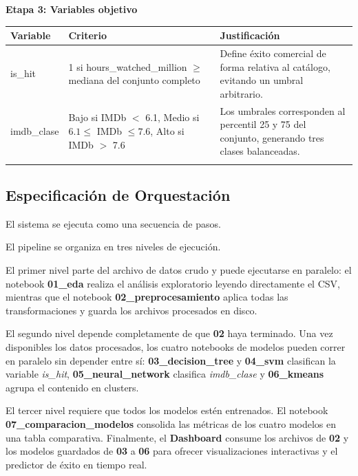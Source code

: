 \documentclass[12pt,a4paper]{article}
\begin{document}
\vspace{0.5cm}

\textbf{Etapa 3: Variables objetivo}

\vspace{0.2cm}
\begin{center}
\begin{tabular}{p{3cm} p{5.5cm} p{5.5cm}}
\toprule
Variable & Criterio & Justificaci\'on \\
\midrule
\addlinespace[0.15cm]
is\_hit &
1 si hours\_watched\_million $\geq$ mediana del conjunto completo &
Define \'exito comercial de forma relativa al cat\'alogo, evitando un umbral arbitrario. \\
\addlinespace[0.3cm]
imdb\_clase &
Bajo si IMDb $<$ 6.1, Medio si $6.1 \leq$ IMDb $\leq 7.6$, Alto si IMDb $>$ 7.6 &
Los umbrales corresponden al percentil 25 y 75 del conjunto, generando tres clases balanceadas. \\
\addlinespace[0.15cm]
\bottomrule
\end{tabular}
\end{center}

\newpage
\subsection*{Especificaci\'on de Orquestaci\'on}

El sistema se ejecuta como una secuencia de pasos.

El pipeline se organiza en tres niveles de ejecuci\'on.

El primer nivel parte del archivo de datos crudo y puede ejecutarse en paralelo: el notebook \textbf{01\_eda} realiza el an\'alisis exploratorio leyendo directamente el CSV, mientras que el notebook \textbf{02\_preprocesamiento} aplica todas las transformaciones y guarda los archivos procesados en disco.

El segundo nivel depende completamente de que \textbf{02} haya terminado. Una vez disponibles los datos procesados, los cuatro notebooks de modelos pueden correr en paralelo sin depender entre s\'i: \textbf{03\_decision\_tree} y \textbf{04\_svm} clasifican la variable \textit{is\_hit}, \textbf{05\_neural\_network} clasifica \textit{imdb\_clase} y \textbf{06\_kmeans} agrupa el contenido en clusters.

El tercer nivel requiere que todos los modelos est\'en entrenados. El notebook \textbf{07\_comparacion\_modelos} consolida las m\'etricas de los cuatro modelos en una tabla comparativa. Finalmente, el \textbf{Dashboard} consume los archivos de \textbf{02} y los modelos guardados de \textbf{03} a \textbf{06} para ofrecer visualizaciones interactivas y el predictor de \'exito en tiempo real.
\end{document}
